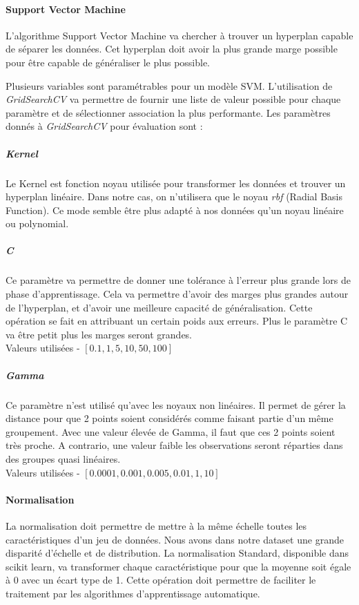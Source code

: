     \paragraph{Support Vector Machine}
        L'algorithme Support Vector Machine va chercher à trouver un hyperplan capable de séparer les données.
        Cet hyperplan doit avoir la plus grande marge possible pour être capable de généraliser le plus possible.

        Plusieurs variables sont paramétrables pour un modèle SVM\@.
        L'utilisation de \emph{GridSearchCV} va permettre de fournir une liste de valeur possible pour chaque paramètre et de sélectionner association la plus performante.
        Les paramètres donnés à \emph{GridSearchCV} pour évaluation sont :
        \subparagraph{Kernel}
            Le Kernel est fonction noyau utilisée pour transformer les données et trouver un hyperplan linéaire.
            Dans notre cas, on n'utilisera que le noyau \emph{rbf} (Radial Basis Function).
            Ce mode semble être plus adapté à nos données qu'un noyau linéaire ou polynomial.

        \subparagraph{C}
            Ce paramètre va permettre de donner une tolérance à l'erreur plus grande lors de phase d'apprentissage.
            Cela va permettre d'avoir des marges plus grandes autour de l'hyperplan, et d'avoir une meilleure capacité de généralisation.
            Cette opération se fait en attribuant un certain poids aux erreurs.
            Plus le paramètre C va être petit plus les marges seront grandes.\\
            Valeurs utilisées - $[0.1, 1, 5, 10, 50, 100]$

        \subparagraph{Gamma}
            Ce paramètre n'est utilisé qu'avec les noyaux non linéaires.
            Il permet de gérer la distance pour que 2 points soient considérés comme faisant partie d'un même groupement.
            Avec une valeur élevée de Gamma, il faut que ces 2 points soient très proche.
            A contrario, une valeur faible les observations seront réparties dans des groupes quasi linéaires.\\
            Valeurs utilisées - $[0.0001, 0.001, 0.005, 0.01, 1, 10]$

    \paragraph{Normalisation}
        La normalisation doit permettre de mettre à la même échelle toutes les caractéristiques d'un jeu de données.
        Nous avons dans notre dataset une grande disparité d'échelle et de distribution.
        La normalisation Standard, disponible dans scikit learn, va transformer chaque caractéristique pour que la moyenne soit égale à 0 avec un écart type de 1.
        Cette opération doit permettre de faciliter le traitement par les algorithmes d'apprentissage automatique.


